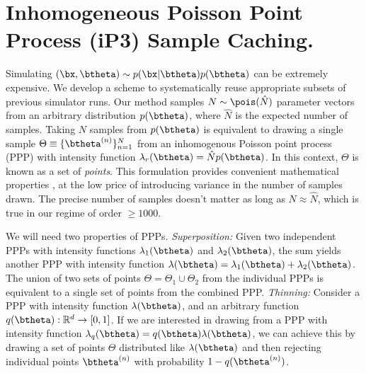 \section{Inhomogeneous Poisson Point Process (iP3) Sample Caching.}
%
Simulating $(\bx, \btheta)\sim p(\bx|\btheta)p(\btheta)$ can be extremely expensive. We develop a scheme to systematically reuse appropriate subsets of previous simulator runs. Our method samples $N\sim \pois(\hat N)$ parameter vectors from an arbitrary distribution $p(\btheta)$, where $\hat N$ is the expected number of samples. 
%
Taking $N$ samples from $p(\btheta)$ is equivalent to drawing a single sample
$\Theta \equiv \{\btheta^{(n)}\}_{n=1}^{N}$
from an inhomogenous Poisson point process (PPP) with intensity function $\lambda_{r}(\btheta) = \hat{N} p(\btheta)$. In this context, $\Theta$ is known as a set of \emph{points}. This formulation provides convenient mathematical properties \cite{ppp}, at the low price of introducing variance in the number of samples drawn. 
The precise number of samples doesn't matter as long as $N \approx \hat{N}$, which is true in our regime of order $\geq 1000$.
%

We will need two properties of PPPs.  \emph{Superposition:} Given two independent PPPs with intensity functions $\lambda_{1}(\btheta)$ and  $\lambda_{2}(\btheta)$, the sum yields another PPP with intensity function $\lambda(\btheta) = \lambda_{1}(\btheta) + \lambda_{2}(\btheta)$. 
The union of two sets of points  $\Theta = \Theta_1 \cup \Theta_2$ from the individual PPPs is equivalent to a single set of points from the combined PPP.
\emph{Thinning:} Consider a PPP with intensity function $\lambda(\btheta)$, and an arbitrary function $q(\btheta): \mathbb{R}^{d} \to [0, 1]$. 
If we are interested in drawing from a PPP with intensity function $\lambda_{q}(\btheta) = q(\btheta) \lambda(\btheta)$, we can achieve this by drawing a set of points $\Theta$ distributed like $\lambda(\btheta)$ and then rejecting individual points $\btheta^{(n)}$ with probability $1 - q(\btheta^{(n)})$.

